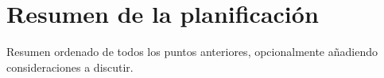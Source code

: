\section{Resumen de la planificación}
\label{sec:planningResume}

\begin{shaded}
Resumen ordenado de todos los puntos anteriores, opcionalmente añadiendo consideraciones a discutir.
\end{shaded}